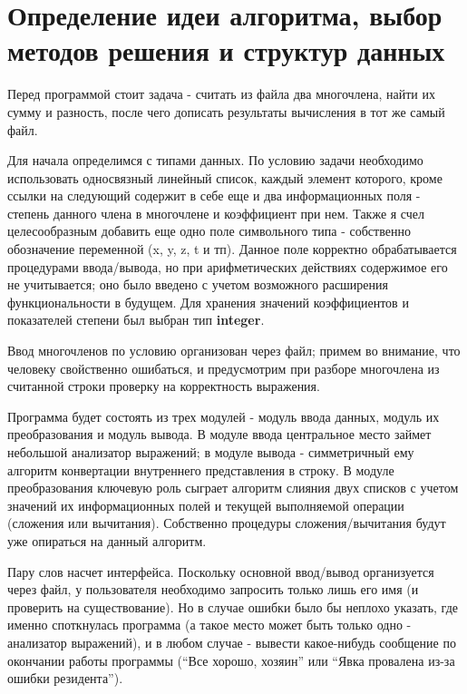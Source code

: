 \section{Определение идеи алгоритма, выбор методов решения и структур данных}
\par
Перед программой стоит задача - считать из файла два многочлена, найти их
сумму и разность, после чего дописать результаты вычисления в тот же самый
файл.
\par
Для начала определимся с типами данных. По условию задачи необходимо
использовать односвязный линейный список, каждый элемент которого, кроме ссылки
на следующий содержит в себе еще и два информационных поля - степень данного
члена в многочлене и коэффициент при нем. Также я счел целесообразным добавить
еще одно поле символьного типа - собственно обозначение переменной (x, y, z, t 
и тп). Данное поле корректно обрабатывается процедурами ввода/вывода, но при
арифметических действиях содержимое его не учитывается; оно было введено с
учетом возможного расширения
функциональности в будущем. Для хранения значений коэффициентов и показателей
степени был выбран тип {\bf integer}. 
\par
Ввод многочленов по условию организован через файл; примем во внимание, что
человеку свойственно ошибаться, и предусмотрим при разборе многочлена из
считанной строки проверку
на корректность выражения.
\par
Программа будет состоять из трех модулей - модуль ввода данных, модуль их
преобразования и модуль вывода. В модуле ввода центральное место займет
небольшой анализатор выражений; в модуле вывода - симметричный ему алгоритм
конвертации внутреннего представления в строку. В модуле преобразования
ключевую роль сыграет алгоритм слияния двух списков с учетом значений их
информационных полей и текущей выполняемой операции (сложения или вычитания).
Собственно процедуры сложения/вычитания будут уже опираться на данный
алгоритм.
\par
Пару слов насчет интерфейса. Поскольку основной ввод/вывод организуется через
файл, у пользователя необходимо запросить только лишь его имя (и проверить на
существование). Но в случае ошибки было бы неплохо указать, где именно
споткнулась программа (а такое место может быть только одно - анализатор
выражений), и в любом случае - вывести какое-нибудь сообщение по окончании
работы программы (``Все хорошо, хозяин'' или ``Явка провалена из-за ошибки
резидента'').
\pagebreak

